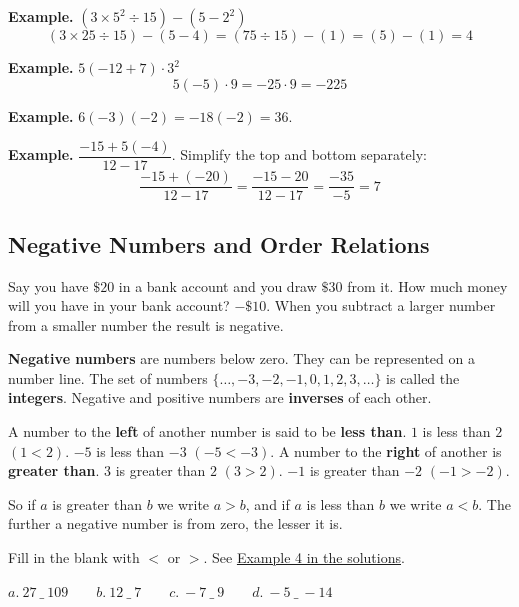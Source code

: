 \documentclass[letter]{article}
\newenvironment{keybox}
  {\begin{lrbox}{\keyboxsave}\begin{minipage}{\dimexpr\linewidth-2\fboxsep-2\fboxrule\relax}}
  {\end{minipage}\end{lrbox}\par\noindent\fbox{\usebox{\keyboxsave}}\par}
\newcommand{\exbox}[1]{\fbox{\textbf{Example #1}}}
\newcommand{\chp}{}
\newcommand{\seesol}[1]{See \hyperref[sec:\chp ex#1]{Example #1 in the solutions}.}
\begin{document}
\textbf{Example.} $(3\times5^2\div15)-(5-2^2)$
\[(3\times25\div15)-(5-4)=(75\div15)-(1)=(5)-(1)=4\]

\textbf{Example.} $5(-12+7)\cdot3^2$
\[5(-5)\cdot9=-25\cdot9=-225\]

\textbf{Example.} $6(-3)(-2)=-18(-2)=36$.

\textbf{Example.} $\dfrac{-15+5(-4)}{12-17}$. Simplify the top and bottom separately:
\[\frac{-15+(-20)}{12-17}=\frac{-15-20}{12-17}=\frac{-35}{-5}=7\]

\subsection{Negative Numbers and Order Relations}

Say you have $\$20$ in a bank account and you draw $\$30$ from it. How much money will you have in your bank account? $-\$10$. When you subtract a larger number from a smaller number the result is negative.

\begin{keybox}
\textbf{Negative numbers} are numbers below zero. They can be represented on a number line. The set of numbers $\{\ldots,-3,-2,-1,0,1,2,3,\ldots\}$ is called the \textbf{integers}. Negative and positive numbers are \textbf{inverses} of each other.
\end{keybox}

\begin{center}
\end{center}

A number to the \textbf{left} of another number is said to be \textbf{less than}. $1$ is less than $2$ $(1<2)$. $-5$ is less than $-3$ $(-5<-3)$. A number to the \textbf{right} of another is \textbf{greater than}. $3$ is greater than $2$ $(3>2)$. $-1$ is greater than $-2$ $(-1>-2)$.

So if $a$ is greater than $b$ we write $a>b$, and if $a$ is less than $b$ we write $a<b$. The further a negative number is from zero, the lesser it is.

\exbox{4} Fill in the blank with $<$ or $>$. \seesol{4}
\begin{center}
$a.\ 27\ \_\ 109\qquad b.\ 12\ \_\ 7\qquad c.\ -7\ \_\ 9\qquad d.\ -5\ \_\ -14$
\end{center}
\end{document}

